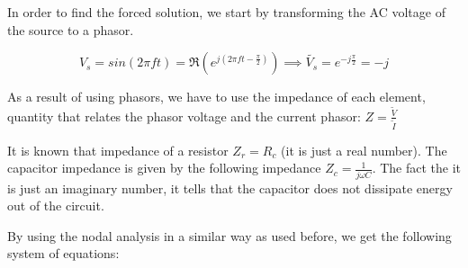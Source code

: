 In order to find the forced solution, we start by transforming the AC voltage of the source to a phasor.

\begin{equation}
  V_s = sin(2\pi f t) = \Re (e^{j(2\pi f t - \frac{\pi}{2})}) \implies \tilde{V_s} = e^{-j \frac{\pi}{2}} = -j
\end{equation}

As a result of using phasors, we have to use the impedance of each element, quantity that relates the phasor voltage and the current phasor: $Z = \frac{\tilde{V}}{\tilde{I}} $

It is known that impedance of a resistor $Z_r = R_c$ (it is just a real number). The capacitor impedance is given by the following impedance $Z_c = \frac{1}{j\omega C}$.
The fact the it is just an imaginary number, it tells that the capacitor does not dissipate energy out of the circuit.

By using the nodal analysis in a similar way as used before, we get the following system of equations:

